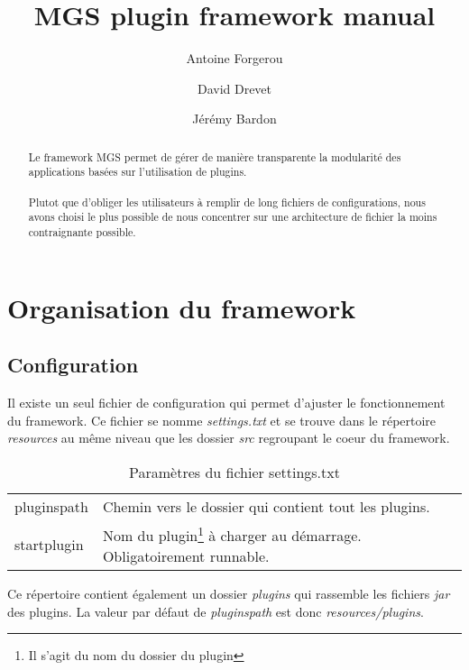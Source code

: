 \documentclass[12pt,a4paper]{article}
\title{MGS plugin framework manual}
\author{Antoine Forgerou \and David Drevet \and Jérémy Bardon}
\date{}
\begin{document}
	\renewcommand{\contentsname}{Sommaire}
	\renewcommand{\arraystretch}{1.8}
	\maketitle	
	
	\vspace{0.80cm}
	\tableofcontents	

	\thispagestyle{empty}	
	\setcounter{page}{0}
	\newpage
	
\begin{abstract}
Le framework MGS permet de gérer de manière transparente la modularité des 
applications basées sur l'utilisation de plugins. 
\\\\
Plutot que d'obliger les utilisateurs à remplir de long fichiers de configurations, 
nous avons choisi le plus possible de nous concentrer sur une architecture de 
fichier la moins contraignante possible.
\end{abstract}

\section{Organisation du framework}
\subsection{Configuration}
Il existe un seul fichier de configuration qui permet d'ajuster le fonctionnement 
du framework. Ce fichier se nomme \emph{settings.txt} et se trouve dans le 
répertoire \emph{resources} au même niveau que les dossier \emph{src} regroupant le
coeur du framework.

\begin{table}[h]
\centering
	\begin{tabular}{lp{9cm}}
		pluginspath & Chemin vers le dossier qui contient tout les plugins.\\
					 
		startplugin & Nom du plugin\footnote{Il s'agit du nom du dossier du 
		plugin} à charger au démarrage. Obligatoirement runnable.\\					 
	\end{tabular}	
\caption{Paramètres du fichier settings.txt}
\end{table}
	
Ce répertoire contient également un dossier \emph{plugins} qui rassemble les fichiers 
\emph{jar} des plugins. La valeur par défaut de \emph{pluginspath} est donc 
\emph{resources/plugins}.
\end{document}
